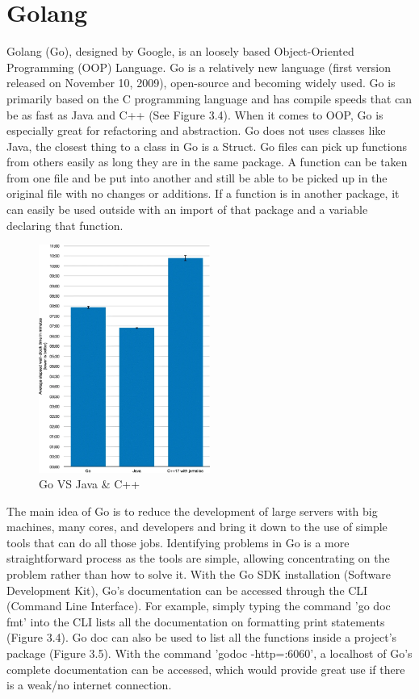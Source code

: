 \section{Golang}
Golang (Go), designed by Google, is an loosely based Object-Oriented Programming (OOP) Language. Go is a relatively new language (first version released on November 10, 2009), open-source and becoming widely used. Go is primarily based on the C programming language and has compile speeds that can be as fast as Java and C++ (See Figure 3.4). \cite{ref6} When it comes to OOP, Go is especially great for refactoring and abstraction. Go does not uses classes like Java, the closest thing to a class in Go is a Struct. \cite{ref7} Go files can pick up functions from others easily as long they are in the same package. A function can be taken from one file and be put into another and still be able to be picked up in the original file with no changes or additions. If a function is in another package, it can easily be used outside with an import of that package and a variable declaring that function. 

\begin{figure}[H]
    \caption{Go VS Java \& C++ \cite{ref6}}
    \label{image:goJavaCpp}
    \centering
    \includegraphics[width=0.5\textwidth]{images/misc/go-java-cpp.png}
\end{figure}

The main idea of Go is to reduce the development of large servers with big machines, many cores, and developers and bring it down to the use of simple tools that can do all those jobs. Identifying problems in Go is a more straightforward process as the tools are simple, allowing concentrating on the problem rather than how to solve it. With the Go SDK installation (Software Development Kit), Go's documentation can be accessed through the CLI (Command Line Interface). For example, simply typing the command 'go doc fmt' into the CLI lists all the documentation on formatting print statements (Figure 3.4). Go doc can also be used to list all the functions inside a project's package (Figure 3.5). With the command 'godoc -http=:6060', a localhost of Go's complete documentation can be accessed, which would provide great use if there is a weak/no internet connection.


